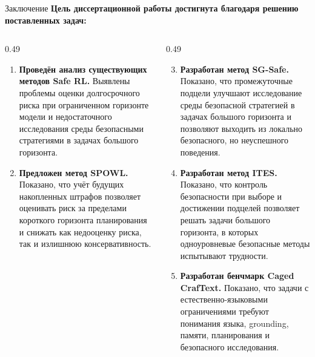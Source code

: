 \begin{frame}[shrink=5,noframenumbering]{Заключение}
    \centering
    {\normalsize\textbf{Цель диссертационной работы достигнута благодаря решению
    поставленных задач:}}

    \vspace{0.35em}
    \raggedright
    \footnotesize
    \begin{columns}[T,onlytextwidth]
        \begin{column}{0.49\textwidth}
            \begin{enumerate}
                \item \textbf{Проведён анализ существующих методов Safe RL.}
                      Выявлены проблемы оценки долгосрочного риска при
                      ограниченном горизонте модели и недостаточного
                      исследования среды безопасными стратегиями в задачах
                      большого горизонта.
                \item \textbf{Предложен метод SPOWL.} Показано, что учёт
                      будущих накопленных штрафов позволяет оценивать риск за
                      пределами короткого горизонта планирования и снижать как
                      недооценку риска, так и излишнюю консервативность.
            \end{enumerate}
        \end{column}
        \begin{column}{0.49\textwidth}
            \begin{enumerate}
                \setcounter{enumi}{2}
                \item \textbf{Разработан метод SG-Safe.} Показано, что
                      промежуточные подцели улучшают исследование среды безопасной
                      стратегией в задачах большого горизонта и позволяют выходить
                      из локально безопасного, но неуспешного поведения.
                \item \textbf{Разработан метод ITES.} Показано, что контроль
                      безопасности при выборе и достижении подцелей позволяет
                      решать задачи большого горизонта, в которых одноуровневые
                      безопасные методы испытывают трудности.
                \item \textbf{Разработан бенчмарк Caged CrafText.} Показано,
                      что задачи с естественно-языковыми ограничениями требуют
                      понимания языка, grounding, памяти, планирования и
                      безопасного исследования.
            \end{enumerate}
        \end{column}
    \end{columns}
\end{frame}
